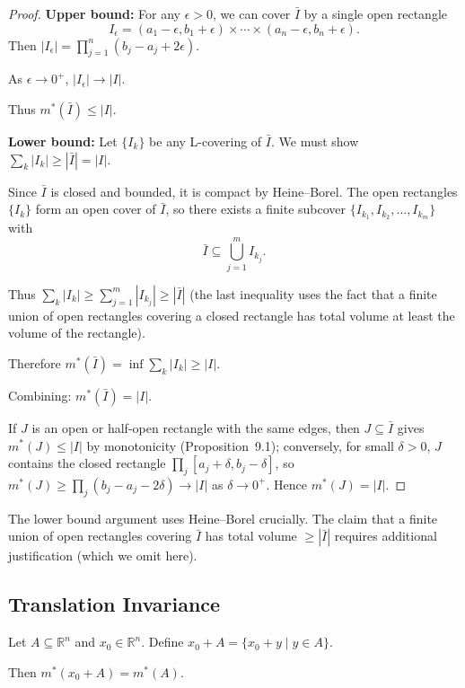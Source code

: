 \documentclass[11pt]{report}
\begin{document}
\begin{proof}
\textbf{Upper bound:} For any $\epsilon > 0$, we can cover $\bar{I}$ by a single open rectangle
\[
I_\epsilon = (a_1 - \epsilon, b_1 + \epsilon) \times \cdots \times (a_n - \epsilon, b_n + \epsilon).
\]
Then $|I_\epsilon| = \prod_{j=1}^{n} (b_j - a_j + 2\epsilon)$.

As $\epsilon \to 0^+$, $|I_\epsilon| \to |I|$.

Thus $m^*(\bar{I}) \leq |I|$.

\textbf{Lower bound:} Let $\{I_k\}$ be any L-covering of $\bar{I}$. We must show $\sum_k |I_k| \geq |\bar{I}| = |I|$.

Since $\bar{I}$ is closed and bounded, it is compact by Heine--Borel. The open rectangles $\{I_k\}$ form an open cover of $\bar{I}$, so there exists a finite subcover $\{I_{k_1}, I_{k_2}, \ldots, I_{k_m}\}$ with
\[
\bar{I} \subseteq \bigcup_{j=1}^{m} I_{k_j}.
\]

Thus $\sum_k |I_k| \geq \sum_{j=1}^{m} |I_{k_j}| \geq |\bar{I}|$ (the last inequality uses the fact that a finite union of open rectangles covering a closed rectangle has total volume at least the volume of the rectangle).

Therefore $m^*(\bar{I}) = \inf \sum_k |I_k| \geq |I|$.

Combining: $m^*(\bar{I}) = |I|$.

If $J$ is an open or half-open rectangle with the same edges, then $J \subseteq \bar{I}$ gives $m^*(J) \leq |I|$ by monotonicity (Proposition~9.1); conversely, for small $\delta > 0$, $J$ contains the closed rectangle $\prod_{j} [a_j + \delta, b_j - \delta]$, so $m^*(J) \geq \prod_{j} (b_j - a_j - 2\delta) \to |I|$ as $\delta \to 0^+$. Hence $m^*(J) = |I|$.
\end{proof}

\begin{rembox}
The lower bound argument uses Heine--Borel crucially. The claim that a finite union of open rectangles covering $\bar{I}$ has total volume $\geq |\bar{I}|$ requires additional justification (which we omit here).
\end{rembox}

\subsection{Translation Invariance}

\begin{propbox}
Let $A \subseteq \mathbb{R}^n$ and $x_0 \in \mathbb{R}^n$. Define $x_0 + A = \{x_0 + y \mid y \in A\}$.

Then $m^*(x_0 + A) = m^*(A)$.
\end{propbox}
\end{document}
